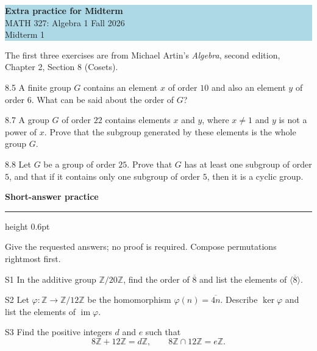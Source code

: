 \documentclass[11pt]{article}
\newcommand{\chapterheading}[1]{%
  \par\vspace{0.5em}
  {\color{courseblue}\Large\bfseries #1}\par\vspace{0.35em}
  {\color{boxborder}\hrule height 0.6pt}\vspace{0.35em}
}
\begin{document}
\begin{center}
\colorbox{lightblue}{\begin{minipage}{0.92\textwidth}
\vspace{0.5em}
{\color{courseblue}\bfseries\Large Extra practice for Midterm}\\[0.4em]
MATH 327: Algebra 1 \hfill Fall 2026\\[0.2em]
Midterm 1
\vspace{0.5em}
\end{minipage}}
\end{center}
The first three exercises are from Michael Artin's \emph{Algebra}, second edition,
Chapter 2, Section 8 (Cosets).
\begin{exercise}{8.5}
A finite group $G$ contains an element $x$ of order $10$ and also an element
$y$ of order $6$. What can be said about the order of $G$?
\end{exercise}
\vspace{2.5cm}
\begin{exercise}{8.7}
A group $G$ of order $22$ contains elements $x$ and $y$, where $x\ne1$
and $y$ is not a power of $x$. Prove that the subgroup generated by these
elements is the whole group $G$.
\end{exercise}
\vspace{2.5cm}
\begin{exercise}{8.8}
Let $G$ be a group of order $25$. Prove that $G$ has at least one subgroup
of order $5$, and that if it contains only one subgroup of order $5$,
then it is a cyclic group.
\end{exercise}
\vspace{2.5cm}
\newpage
\chapterheading{Short-answer practice}
Give the requested answers; no proof is required. Compose permutations rightmost first.
\begin{exercise}{S1}
In the additive group $\mathbb Z/20\mathbb Z$, find the order of
$\overline{8}$ and list the elements of $\langle\overline{8}\rangle$.
\end{exercise}
\vspace{1.8cm}
\begin{exercise}{S2}
Let $\varphi:\mathbb Z\to\mathbb Z/12\mathbb Z$ be the homomorphism
$\varphi(n)=\overline{4n}$. Describe $\ker\varphi$ and list the elements
of $\operatorname{im}\varphi$.
\end{exercise}
\vspace{1.8cm}
\begin{exercise}{S3}
Find the positive integers $d$ and $e$ such that
\[
8\mathbb Z+12\mathbb Z=d\mathbb Z,
\qquad 8\mathbb Z\cap12\mathbb Z=e\mathbb Z.
\]
\end{exercise}
\end{document}
